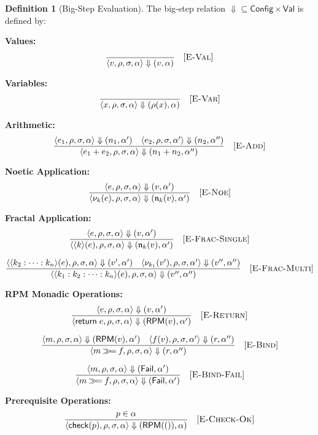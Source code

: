 \documentclass[11pt,twoside,openright]{book}
\theoremstyle{definition}
\newtheorem{definition}{Definition}[chapter]
\theoremstyle{plain}
\theoremstyle{remark}
\newcommand{\noe}[1]{\nu_{#1}}
\newcommand{\rpmret}{\mathsf{return}}
\newcommand{\rpmbind}{\mathbin{\gg\!=}}
\newcommand{\Val}{\mathsf{Val}}
\newcommand{\Config}{\mathsf{Config}}
\newcommand{\bigstep}{\Downarrow}
\newcommand{\Failed}{\mathsf{Fail}}
\begin{document}
\begin{definition}[Big-Step Evaluation]
\label{def:big-step}
The big-step relation $\bigstep \subseteq \Config \times \Val$ is defined by:

\textbf{Values:}
\[
\frac{}{\langle v, \rho, \sigma, \alpha \rangle \bigstep (v, \alpha)} \quad [\textsc{E-Val}]
\]

\textbf{Variables:}
\[
\frac{}{\langle x, \rho, \sigma, \alpha \rangle \bigstep (\rho(x), \alpha)} \quad [\textsc{E-Var}]
\]

\textbf{Arithmetic:}
\[
\frac{\langle e_1, \rho, \sigma, \alpha \rangle \bigstep (n_1, \alpha') \quad \langle e_2, \rho, \sigma, \alpha' \rangle \bigstep (n_2, \alpha'')}{\langle e_1 + e_2, \rho, \sigma, \alpha \rangle \bigstep (n_1 + n_2, \alpha'')} \quad [\textsc{E-Add}]
\]

\textbf{Noetic Application:}
\[
\frac{\langle e, \rho, \sigma, \alpha \rangle \bigstep (v, \alpha')}{\langle \noe{k}(e), \rho, \sigma, \alpha \rangle \bigstep (\mathfrak{n}_k(v), \alpha')} \quad [\textsc{E-Noe}]
\]

\textbf{Fractal Application:}
\[
\frac{\langle e, \rho, \sigma, \alpha \rangle \bigstep (v, \alpha')}{\langle \langle k \rangle(e), \rho, \sigma, \alpha \rangle \bigstep (\mathfrak{n}_k(v), \alpha')} \quad [\textsc{E-Frac-Single}]
\]

\[
\frac{\langle \langle k_2 : \cdots : k_n \rangle(e), \rho, \sigma, \alpha \rangle \bigstep (v', \alpha') \quad \langle \noe{k_1}(v'), \rho, \sigma, \alpha' \rangle \bigstep (v'', \alpha'')}{\langle \langle k_1 : k_2 : \cdots : k_n \rangle(e), \rho, \sigma, \alpha \rangle \bigstep (v'', \alpha'')} \quad [\textsc{E-Frac-Multi}]
\]

\textbf{RPM Monadic Operations:}
\[
\frac{\langle e, \rho, \sigma, \alpha \rangle \bigstep (v, \alpha')}{\langle \rpmret\; e, \rho, \sigma, \alpha \rangle \bigstep (\mathsf{RPM}(v), \alpha')} \quad [\textsc{E-Return}]
\]

\[
\frac{\langle m, \rho, \sigma, \alpha \rangle \bigstep (\mathsf{RPM}(v), \alpha') \quad \langle f(v), \rho, \sigma, \alpha' \rangle \bigstep (r, \alpha'')}{\langle m \rpmbind f, \rho, \sigma, \alpha \rangle \bigstep (r, \alpha'')} \quad [\textsc{E-Bind}]
\]

\[
\frac{\langle m, \rho, \sigma, \alpha \rangle \bigstep (\Failed, \alpha')}{\langle m \rpmbind f, \rho, \sigma, \alpha \rangle \bigstep (\Failed, \alpha')} \quad [\textsc{E-Bind-Fail}]
\]

\textbf{Prerequisite Operations:}
\[
\frac{p \in \alpha}{\langle \mathsf{check}(p), \rho, \sigma, \alpha \rangle \bigstep (\mathsf{RPM}(()), \alpha)} \quad [\textsc{E-Check-Ok}]
\]


\end{definition}
\end{document}

